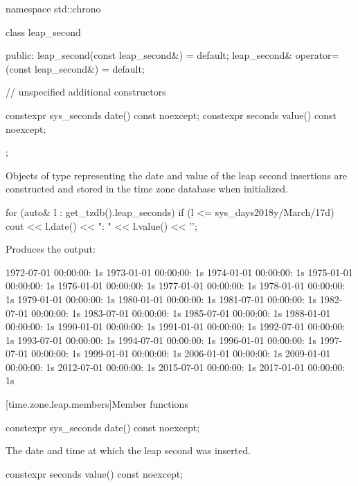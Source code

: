 \begin{codeblock}
namespace std::chrono {
  class leap_second {
  public:
    leap_second(const leap_second&)            = default;
    leap_second& operator=(const leap_second&) = default;

    // unspecified additional constructors

    constexpr sys_seconds date() const noexcept;
    constexpr seconds value() const noexcept;
  };
}
\end{codeblock}

\pnum
Objects of type  representing
the date and value of the leap second insertions
are constructed and stored in the time zone database when initialized.

\pnum
\begin{example}
\begin{codeblock}
for (auto& l : get_tzdb().leap_seconds)
  if (l <= sys_days{2018y/March/17d})
    cout << l.date() << ": " << l.value() << '\n';
\end{codeblock}

Produces the output:

\begin{outputblock}
1972-07-01 00:00:00: 1s
1973-01-01 00:00:00: 1s
1974-01-01 00:00:00: 1s
1975-01-01 00:00:00: 1s
1976-01-01 00:00:00: 1s
1977-01-01 00:00:00: 1s
1978-01-01 00:00:00: 1s
1979-01-01 00:00:00: 1s
1980-01-01 00:00:00: 1s
1981-07-01 00:00:00: 1s
1982-07-01 00:00:00: 1s
1983-07-01 00:00:00: 1s
1985-07-01 00:00:00: 1s
1988-01-01 00:00:00: 1s
1990-01-01 00:00:00: 1s
1991-01-01 00:00:00: 1s
1992-07-01 00:00:00: 1s
1993-07-01 00:00:00: 1s
1994-07-01 00:00:00: 1s
1996-01-01 00:00:00: 1s
1997-07-01 00:00:00: 1s
1999-01-01 00:00:00: 1s
2006-01-01 00:00:00: 1s
2009-01-01 00:00:00: 1s
2012-07-01 00:00:00: 1s
2015-07-01 00:00:00: 1s
2017-01-01 00:00:00: 1s
\end{outputblock}
\end{example}

[time.zone.leap.members]{Member functions}

%
\begin{itemdecl}
constexpr sys_seconds date() const noexcept;
\end{itemdecl}

\begin{itemdescr}
\pnum
\returns
The date and time at which the leap second was inserted.
\end{itemdescr}

%
\begin{itemdecl}
constexpr seconds value() const noexcept;
\end{itemdecl}

